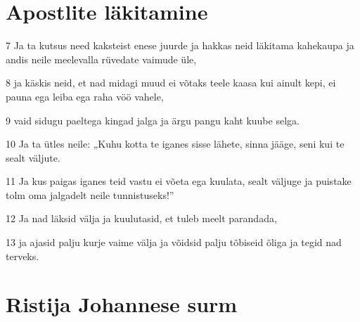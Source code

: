\section*{Apostlite läkitamine}

\par 7 Ja ta kutsus need kaksteist enese juurde ja hakkas neid läkitama kahekaupa ja andis neile meelevalla rüvedate vaimude üle,
\par 8 ja käskis neid, et nad midagi muud ei võtaks teele kaasa kui ainult kepi, ei pauna ega leiba ega raha vöö vahele,
\par 9 vaid sidugu paeltega kingad jalga ja ärgu pangu kaht kuube selga.
\par 10 Ja ta ütles neile: „Kuhu kotta te iganes sisse lähete, sinna jääge, seni kui te sealt väljute.
\par 11 Ja kus paigas iganes teid vastu ei võeta ega kuulata, sealt väljuge ja puistake tolm oma jalgadelt neile tunnistuseks!”
\par 12 Ja nad läksid välja ja kuulutasid, et tuleb meelt parandada,
\par 13 ja ajasid palju kurje vaime välja ja võidsid palju tõbiseid õliga ja tegid nad terveks.

\section*{Ristija Johannese surm}

